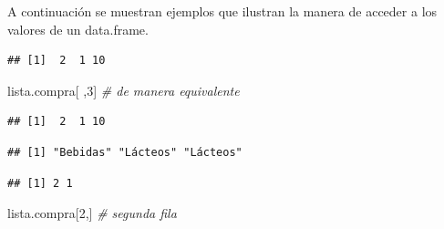 \documentclass[
]{book}
\newenvironment{Shaded}{\begin{snugshade}}{\end{snugshade}}
\newcommand{\CommentTok}[1]{\textcolor[rgb]{0.56,0.35,0.01}{\textit{#1}}}
\newcommand{\DecValTok}[1]{\textcolor[rgb]{0.00,0.00,0.81}{#1}}
\newcommand{\NormalTok}[1]{#1}
\newcommand{\SpecialCharTok}[1]{\textcolor[rgb]{0.00,0.00,0.00}{#1}}
\theoremstyle{break}
\theoremstyle{nonumberplain}
\begin{document}
A continuación se muestran ejemplos que ilustran la manera de acceder
a los valores de un data.frame.

\begin{Shaded}
\end{Shaded}

\begin{verbatim}
## [1]  2  1 10
\end{verbatim}

\begin{Shaded}
\begin{Highlighting}[]
\NormalTok{lista.compra[ ,}\DecValTok{3}\NormalTok{]  }\CommentTok{\# de manera equivalente}
\end{Highlighting}
\end{Shaded}

\begin{verbatim}
## [1]  2  1 10
\end{verbatim}

\begin{Shaded}
\end{Shaded}

\begin{verbatim}
## [1] "Bebidas" "Lácteos" "Lácteos"
\end{verbatim}

\begin{Shaded}
\end{Shaded}

\begin{verbatim}
## [1] 2 1
\end{verbatim}

\begin{Shaded}
\begin{Highlighting}[]
\NormalTok{lista.compra[}\DecValTok{2}\NormalTok{,]  }\CommentTok{\# segunda fila}
\end{Highlighting}
\end{Shaded}
\end{document}
